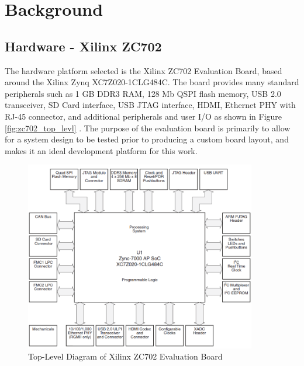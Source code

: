 
\chapter{Background}

\section{Hardware - Xilinx ZC702}

The hardware platform selected is the Xilinx ZC702 Evaluation Board, based around the Xilinx Zynq XC7Z020-1CLG484C. The board provides many standard peripherals such as 1 GB DDR3 RAM, 128 Mb QSPI flash memory, USB 2.0 transceiver, SD Card interface, USB JTAG interface, HDMI, Ethernet PHY with RJ-45 connector, and additional peripherals and user I/O as shown in Figure \ref{fig:zc702_top_levl} \cite{xilinx_zc702}.  The purpose of the evaluation board is primarily to allow for a system design to be tested prior to producing a custom board layout, and makes it an ideal development platform for this work.

\begin{figure}[!h]
  \centering
  \includegraphics[width=0.9\textwidth]{./img/zc702_top_level.PNG}
  \caption{Top-Level Diagram of Xilinx ZC702 Evaluation Board}
  \label{fig:zc702_top_level}
\end{figure}


